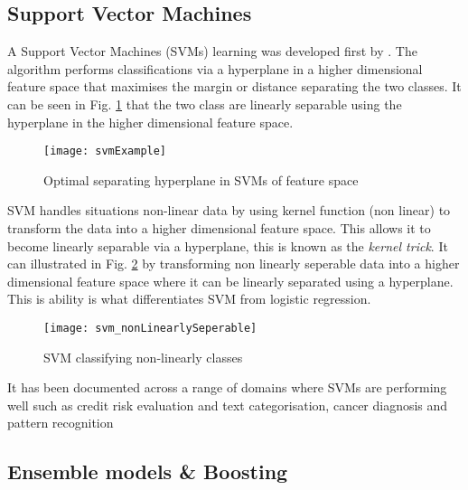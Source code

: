 \subsection{Support Vector Machines} \label{SVM}
A Support Vector Machines (SVMs) learning was developed first by \cite{vapnik_nature_1995}. The algorithm performs classifications via a hyperplane in a higher dimensional feature space that maximises the margin or distance separating the two classes. It can be seen in Fig. \ref{fig:svmExample} that the two class are linearly separable using the hyperplane in the higher dimensional feature space. 

\begin{figure}[H]
	\texttt{[image: svmExample]}
	\caption{Optimal separating hyperplane in SVMs of feature space \\
		\cite[Source:][]{li_adaptive_2011}
	}
	\label{fig:svmExample}
\end{figure}

SVM handles situations non-linear data by using kernel function (non linear) to transform the data into a higher dimensional feature space. This allows it to become linearly separable via a hyperplane, this is known as the \textit{kernel trick}. It can illustrated in Fig. \ref{fig:svm_nonLinearlySeperable} by transforming non linearly seperable data into a higher dimensional feature space where it can be linearly separated using a hyperplane. This is ability is what differentiates SVM from logistic regression.

\begin{figure}[H]
	\texttt{[image: svm\_nonLinearlySeperable]}
	\caption{SVM classifying non-linearly classes \\
		\cite[Source:][]{burges_tutorial_1998}
	}
	\label{fig:svm_nonLinearlySeperable}
\end{figure}

It has been documented across a range of domains where SVMs are performing well such as credit risk evaluation \cite{van_gestel_credit_2009} and text categorisation, cancer diagnosis and pattern recognition \citep{shin_application_2005}

\subsection{Ensemble models \& Boosting} \label{boosting}
\begin{comment}
In 1907, statistician Sir Francis Galton attended a fair in which there was a competition to judge the weight of an Ox. Upon reviewing the 787 predictions made by the competing public, he observed that while there was a 
\end{comment}


